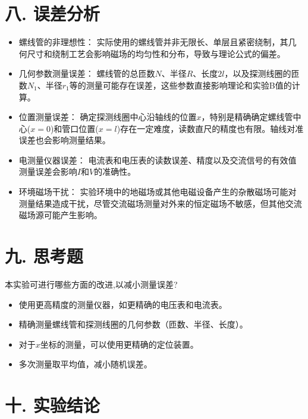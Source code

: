 \documentclass[12pt,a4paper]{article}
\begin{document}
	
	\section*{\textbf{八. 误差分析}}

	\begin{itemize}
    \item 螺线管的非理想性： 实际使用的螺线管并非无限长、单层且紧密绕制，其几何尺寸和绕制工艺会影响磁场的均匀性和分布，导致与理论公式的偏差。

    \item 几何参数测量误差： 螺线管的总匝数$N$、半径$R$、长度$2l$，以及探测线圈的匝数$N_1$、半径$r_1$等的测量可能存在误差，这些参数直接影响理论和实验B值的计算。
    
    \item 位置测量误差： 确定探测线圈中心沿轴线的位置$x$，特别是精确确定螺线管中心($x=0$)和管口位置($x=l$)存在一定难度，读数直尺的精度也有限。轴线对准误差也会影响测量结果。
    
    \item 电测量仪器误差： 电流表和电压表的读数误差、精度以及交流信号的有效值测量误差会影响$I$和$V$的准确性。

    \item 环境磁场干扰： 实验环境中的地磁场或其他电磁设备产生的杂散磁场可能对测量结果造成干扰，尽管交流磁场测量对外来的恒定磁场不敏感，但其他交流磁场源可能产生影响。


\end{itemize}

	\section*{\textbf{九. 思考题}}

	本实验可进行哪些方面的改进,以减小测量误差?
	\begin{itemize}
		\item 使用更高精度的测量仪器，如更精确的电压表和电流表。
		\item 精确测量螺线管和探测线圈的几何参数（匝数、半径、长度）。
		\item 对于$x$坐标的测量，可以使用更精确的定位装置。
		\item 多次测量取平均值，减小随机误差。

	\end{itemize}
	
	\section*{\textbf{{十. 实验结论}}}
\end{document}
